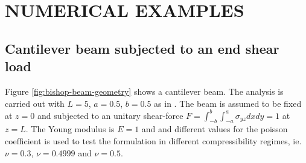 \documentclass{wccm2024}
\begin{document}
\section{NUMERICAL EXAMPLES}

\subsection{Cantilever beam subjected to an end shear load \label{subsec:bishop}}

Figure \ref{fig:bishop-beam-geometry} shows a cantilever beam. The analysis is carried out with $L=5$, $a=0.5$, $b=0.5$ as in \cite{bishop2014displacement}. The beam is assumed to be fixed at $z=0$ and subjected to an unitary shear-force $F=\int_{-b}^{b}\int_{-a}^{a}\sigma_{yz}dxdy=1$ at $z=L$. The Young modulus is $E=1$ and and different values for the poisson coefficient is used to test the formulation in different compressibility regimes, ie. $\nu=0.3$, $\nu=0.4999$ and $\nu=0.5$.

\end{document}
